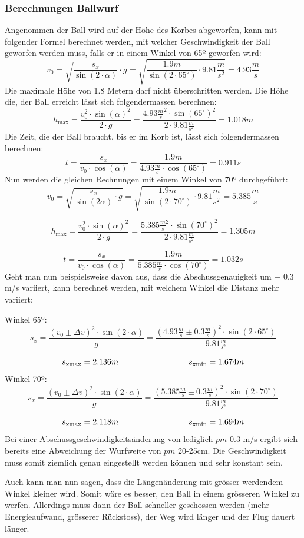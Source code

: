 \subsubsection{Berechnungen Ballwurf}
Angenommen der Ball wird auf der Höhe des Korbes abgeworfen, kann mit 
folgender Formel berechnet werden, mit welcher Geschwindigkeit der Ball 
geworfen werden muss, falls er in einem Winkel von 65º geworfen wird:
%
\[ v_0 
= \sqrt{ \frac{s_x}{\sin(2 \cdot \alpha)} \cdot g } 
= \sqrt{ \frac{1.9m}{\sin(2 \cdot 65^\circ)} \cdot 9.81 \frac{m}{s^2}} 
= 4.93 \frac{m}{s} \]
%
Die maximale Höhe von 1.8 Metern darf nicht überschritten werden. Die Höhe die, 
der Ball erreicht lässt sich folgendermassen berechnen:
%
\[ h_\text{max} 
= \frac{v_0^2 \cdot \sin(\alpha)^2}{2 \cdot g} 
= \frac{4.93 \frac{m}{s}^2 \cdot \sin(65^\circ)^2}{2 \cdot 9.81 \frac{m}{s^2}} 
= 1.018m \]
%
Die Zeit, die der Ball braucht, bis er im Korb ist, lässt sich folgendermassen 
berechnen:
%
\[ t = \frac{s_x}{v_0 \cdot \cos(\alpha)} 
= \frac{1.9m}{4.93 \frac{m}{s} \cdot \cos(65^\circ)} = 0.911s \]
%
Nun werden die gleichen Rechnungen mit einem Winkel von 70º durchgeführt:
%
\[ v_0 = \sqrt{ \frac{s_x}{\sin(2\alpha)} \cdot g } 
= \sqrt{ \frac{1.9m}{\sin(2 \cdot 70^\circ)} \cdot 9.81 \frac{m}{s^2}} 
= 5.385 \frac{m}{s} \]

\[ h_\text{max} = \frac{v_0^2 \cdot \sin(\alpha)^2}{2 \cdot g} 
= \frac{5.385 \frac{m}{s}^2 \cdot \sin(70^\circ)^2}{2 \cdot 9.81 \frac{m}{s^2}} 
= 1.305m \]

\[ t = \frac{s_x}{v_0 \cdot \cos(\alpha)} 
= \frac{1.9m}{5.385 \frac{m}{s} \cdot \cos(70^\circ)} = 1.032s \]
%
Geht man nun beispielsweise davon aus, dass die Abschussgenauigkeit um $\pm$ 0.3 m/s 
variiert, kann berechnet werden, mit welchem Winkel die Distanz mehr variiert:

\noindent
Winkel 65º:
%
\[ s_x = \frac{(v_0 \pm \Delta v)^2 \cdot \sin(2 \cdot \alpha)}{g} 
= \frac{(4.93 \frac{m}{s} \pm 0.3 \frac{m}{s})^2 \cdot \sin(2 \cdot 65^\circ)}{9.81 \frac{m}{s^2}} \]

\[ s_\text{xmax} = 2.136m \hspace{30mm} s_\text{xmin} = 1.674m \]
%
Winkel 70º:
%
\[ s_x = \frac{(v_0 \pm \Delta v)^2 \cdot \sin(2 \cdot \alpha)}{g} 
= \frac{(5.385 \frac{m}{s} \pm 0.3 \frac{m}{s})^2 \cdot \sin(2 \cdot 70^\circ)}{9.81 \frac{m}{s^2}} \]

\[ s_\text{xmax} = 2.118m \hspace{30mm} s_\text{xmin} = 1.694m \]
%
Bei einer Abschussgeschwindigkeitsänderung von lediglich $pm$ 0.3 m/s ergibt sich 
bereits eine Abweichung der Wurfweite von $pm$ 20-25cm. Die Geschwindigkeit muss 
somit ziemlich genau eingestellt werden können und sehr konstant sein.

\noindent
Auch kann man nun sagen, dass die Längenänderung mit grösser werdendem Winkel 
kleiner wird. Somit wäre es besser, den Ball in einem grösseren Winkel zu 
werfen. Allerdings muss dann der Ball schneller geschossen werden (mehr 
Energieaufwand, grösserer Rückstoss), der Weg wird länger und der Flug dauert 
länger.
